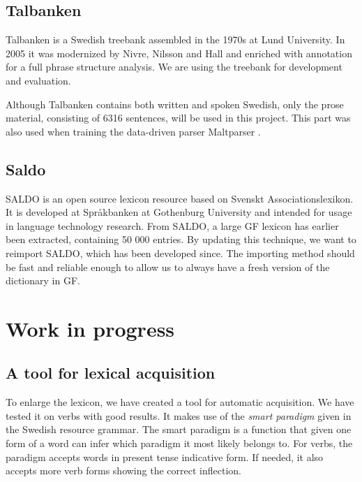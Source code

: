 \documentclass[submission]{eptcs} %
\begin{document}
\subsection{Talbanken}
Talbanken\cite{talbanken} is
a Swedish treebank assembled in the 1970s at Lund University.
In 2005 it was modernized by Nivre, Nilsson and Hall\cite{talbanken05} and
enriched with annotation for a full phrase structure analysis. 
We are using the treebank for development and evaluation. 

Although Talbanken contains both written and spoken Swedish,
only the prose material, consisting of 6316 sentences, will be used in this project.
This part was also used when training the data-driven parser Maltparser \cite{malt}. \\

\subsection{Saldo}
SALDO\cite{saldo} is an open source lexicon resource
based on Svenskt Associationslexikon. It is
developed at Språkbanken at Gothenburg University
and intended for usage in language technology
research. 
From SALDO, a large GF lexicon has earlier been extracted,
containing 50 000 entries. By updating this technique, we want
to reimport SALDO, which has been developed since.
The importing method should be fast and reliable
enough to allow us to always have a fresh version of the dictionary
in GF.


\section{Work in progress}
\label{sec:progress}
\subsection{A tool for lexical acquisition}
To enlarge the lexicon, 
we have created a tool for automatic acquisition. We have
tested it on verbs with good results. It makes use of
the \emph{smart paradigm} given in the Swedish resource grammar.
The smart paradigm is a function that given one form of a word can
infer which paradigm it most likely belongs to.
For verbs, the paradigm accepts words in present tense indicative form.
If needed, it also accepts more verb forms showing the correct inflection.
\end{document}
